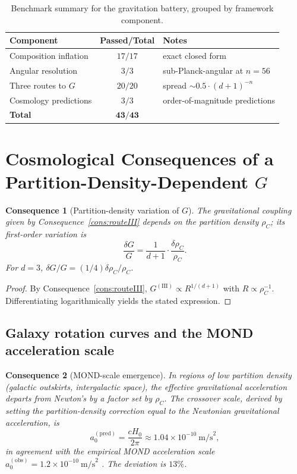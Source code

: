 \documentclass[11pt,twocolumn,a4paper]{article}
\theoremstyle{axiomstyle}
\theoremstyle{conseqstyle}
\newtheorem{consequence}{Consequence}
\theoremstyle{definition}
\theoremstyle{remark}
\begin{document}
\begin{table}[H]
\centering\small
\caption{Benchmark summary for the gravitation battery, grouped by framework component.}
\label{tab:Gbenchmarks}
\begin{tabular}{lcl}
\toprule
Component & Passed/Total & Notes\\
\midrule
Composition inflation & $17/17$ & exact closed form\\
Angular resolution    & $3/3$   & sub-Planck-angular at $n=56$\\
Three routes to $G$   & $20/20$ & spread $\sim 0.5\cdot(d{+}1)^{-n}$\\
Cosmology predictions & $3/3$   & order-of-magnitude predictions\\
\midrule
\textbf{Total}        & $\mathbf{43/43}$ &\\
\bottomrule
\end{tabular}
\end{table}

\section{Cosmological Consequences of a Partition-Density-Dependent $G$}
\label{sec:cosmology}

\begin{consequence}[Partition-density variation of $G$]\label{cons:variableG}
The gravitational coupling given by Consequence~\ref{cons:routeIII} depends on the partition density $\rho_{C}$; its first-order variation is
\begin{equation}
\frac{\delta G}{G}=\frac{1}{d+1}\cdot\frac{\delta\rho_{C}}{\rho_{C}}.
\end{equation}
For $d=3$, $\delta G/G=(1/4)\delta\rho_{C}/\rho_{C}$.
\end{consequence}

\begin{proof}
By Consequence~\ref{cons:routeIII}, $G^{(\mathrm{III})}\propto R^{1/(d+1)}$ with $R\propto\rho_{C}^{-1}$. Differentiating logarithmically yields the stated expression.
\end{proof}

\subsection{Galaxy rotation curves and the MOND acceleration scale}

\begin{consequence}[MOND-scale emergence]\label{cons:mondscale}
In regions of low partition density (galactic outskirts, intergalactic space), the effective gravitational acceleration departs from Newton's by a factor set by $\rho_{C}$. The crossover scale, derived by setting the partition-density correction equal to the Newtonian gravitational acceleration, is
\begin{equation}
a_{0}^{(\mathrm{pred})}=\frac{cH_{0}}{2\pi}\approx 1.04\times10^{-10}~\mathrm{m/s}^{2},
\end{equation}
in agreement with the empirical MOND acceleration scale $a_{0}^{(\mathrm{obs})}=1.2\times10^{-10}~\mathrm{m/s}^{2}$ \citep{milgrom1983,mcgaugh2011,mcgaugh2016}. The deviation is $13\%$.
\end{consequence}
\end{document}
